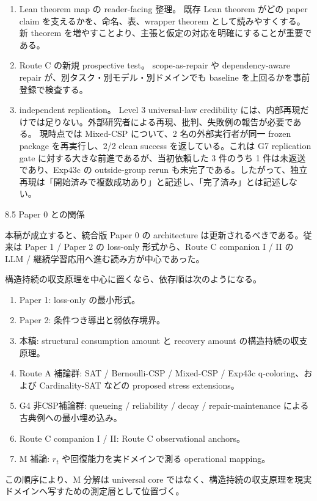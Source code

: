 \documentclass[12pt,a4paper]{article}
\begin{document}
\begin{enumerate}
\item
  Lean theorem map の reader-facing 整理。 既存 Lean theorem がどの paper claim を支えるかを、命名、表、wrapper theorem として読みやすくする。新 theorem を増やすことより、主張と仮定の対応を明確にすることが重要である。
\item
  Route C の新規 prospective test。 scope-as-repair や dependency-aware repair が、別タスク・別モデル・別ドメインでも baseline を上回るかを事前登録で検査する。
\item
  independent replication。 Level 3 universal-law credibility には、内部再現だけでは足りない。外部研究者による再現、批判、失敗例の報告が必要である。 現時点では Mixed-CSP について、2 名の外部実行者が同一 frozen package を再実行し、2/2 clean success を返している。これは G7 replication gate に対する大きな前進であるが、当初依頼した 3 件のうち 1 件は未返送であり、Exp43c の outside-group rerun も未完了である。したがって、独立再現は「開始済みで複数成功あり」と記述し、「完了済み」とは記述しない。
\end{enumerate}

8.5 Paper 0 との関係

本稿が成立すると、統合版 Paper 0 の architecture は更新されるべきである。従来は Paper 1 / Paper 2 の loss-only 形式から、Route C companion I / II の LLM / 継続学習応用へ進む読み方が中心であった。

構造持続の収支原理を中心に置くなら、依存順は次のようになる。

\begin{enumerate}
\def\labelenumi{\arabic{enumi}.}
\tightlist
\item
  Paper 1: loss-only の最小形式。
\item
  Paper 2: 条件つき導出と弱依存境界。
\item
  本稿: structural consumption amount と recovery amount の構造持続の収支原理。
\item
  Route A 補論群: SAT / Bernoulli-CSP / Mixed-CSP / Exp43c q-coloring、および Cardinality-SAT などの proposed stress extensions。
\item
  G4 非CSP補論群: queueing / reliability / decay / repair-maintenance による古典例への最小埋め込み。
\item
  Route C companion I / II: Route C observational anchors。
\item
  M 補論: \(r_{t}\) や回復能力を実ドメインで測る operational mapping。
\end{enumerate}

この順序により、M 分解は universal core ではなく、構造持続の収支原理を現実ドメインへ写すための測定層として位置づく。
\end{document}
